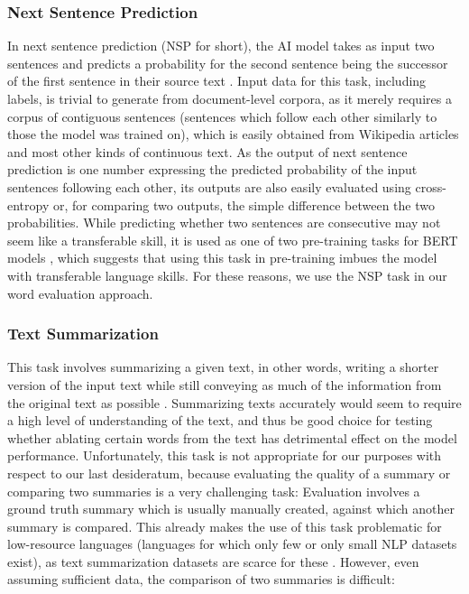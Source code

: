 \subsubsection{Next Sentence Prediction}
In next sentence prediction (NSP for short), the AI model takes as input two sentences and predicts a probability for the second sentence being the successor of the first sentence in their source text \cite{kentonBertPretrainingDeep2019}.
Input data for this task, including labels, is trivial to generate from document-level corpora, as it merely requires a corpus of contiguous sentences (sentences which follow each other similarly to those the model was trained on), which is easily obtained from Wikipedia articles and most other kinds of continuous text.
As the output of next sentence prediction is one number expressing the predicted probability of the input sentences following each other, its outputs are also easily evaluated using cross-entropy or, for comparing two outputs, the simple difference between the two probabilities.
While predicting whether two sentences are consecutive may not seem like a transferable skill, it is used as one of two pre-training tasks for BERT models \cite{kentonBertPretrainingDeep2019}, which suggests that using this task in pre-training imbues the model with transferable language skills.
For these reasons, we use the NSP task in our word evaluation approach.


\subsubsection{Text Summarization} \label{sec:text-summarization}
This task involves summarizing a given text, in other words, writing a shorter version of the input text while still conveying as much of the information from the original text as possible \cite{radevIntroductionSpecialIssue2002}.
Summarizing texts accurately would seem to require a high level of understanding of the text, and thus be good choice for testing whether ablating certain words from the text has detrimental effect on the model performance.
Unfortunately, this task is not appropriate for our purposes with respect to our last desideratum, because evaluating the quality of a summary or comparing two summaries is a very challenging task:
Evaluation involves a ground truth summary which is usually manually created, against which another summary is compared.
This already makes the use of this task problematic for low-resource languages (languages for which only few or only small NLP datasets exist), as text summarization datasets are scarce for these \cite{dahanStateFateSummarization2025}.
However, even assuming sufficient data, the comparison of two summaries is difficult:

